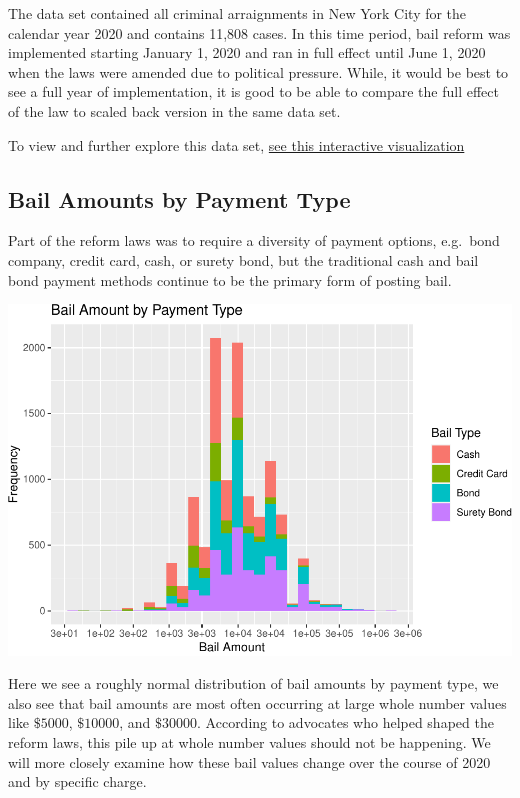 \documentclass[
  english,
  man]{apa6}
\begin{document}
The data set contained all criminal arraignments in New York City for the calendar year 2020 and contains 11,808 cases. In this time period, bail reform was implemented starting January 1, 2020 and ran in full effect until June 1, 2020 when the laws were amended due to political pressure. While, it would be best to see a full year of implementation, it is good to be able to compare the full effect of the law to scaled back version in the same data set.

To view and further explore this data set, \href{https://shamp-jeff.shinyapps.io/Bail_Setting_Patterns_in_New_York_City/}{see this interactive visualization}

\hypertarget{bail-amounts-by-payment-type}{%
\subsection{Bail Amounts by Payment Type}\label{bail-amounts-by-payment-type}}

Part of the reform laws was to require a diversity of payment options, e.g.~bond company, credit card, cash, or surety bond, but the traditional cash and bail bond payment methods continue to be the primary form of posting bail.

\includegraphics{bail_reform_shamp_thesis_files/figure-latex/bail_amount_payment-1.pdf}

Here we see a roughly normal distribution of bail amounts by payment type, we also see that bail amounts are most often occurring at large whole number values like \(\$5000\), \(\$10000\), and \(\$30000\). According to advocates who helped shaped the reform laws, this pile up at whole number values should not be happening. We will more closely examine how these bail values change over the course of 2020 and by specific charge.
\end{document}
